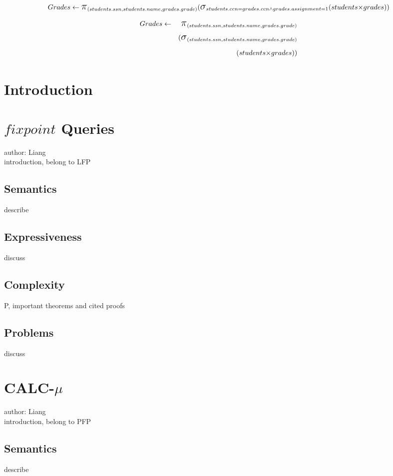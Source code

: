 \documentclass[]{article}
\newcommand{\select}{\mbox{\Large$\sigma$}}
\newcommand{\cross}{\mbox{$\times$}}
\newcommand{\project}{\mbox{\Large$\pi$}}
\begin{document}
\begin{displaymath}
Grades \leftarrow \project_{(students.ssn, students.name, grades.grade)} \\
(\select_{students.ccn = grades.ccn \wedge grades.assignment = 1} \\
(students \cross grades)) \\
\end{displaymath}

\begin{eqnarray*}
Grades & \leftarrow & \project_{(students.ssn, students.name, grades.grade)}  \\
       &            &(\select_{(students.ssn, students.name, grades.grade)}  \\
       &            &          (students \cross grades)) 
\end{eqnarray*}

\section{Introduction}

\section{$fixpoint$ Queries}
author: Liang\\
introduction, belong to LFP
\subsection{Semantics}
describe
\subsection{Expressiveness}
discuss
\subsection{Complexity}
P,
important theorems and cited proofs
\subsection{Problems}
discuss

\section{CALC-$\mu$}
author: Liang\\
introduction, belong to PFP
\subsection{Semantics}
describe
\end{document}

